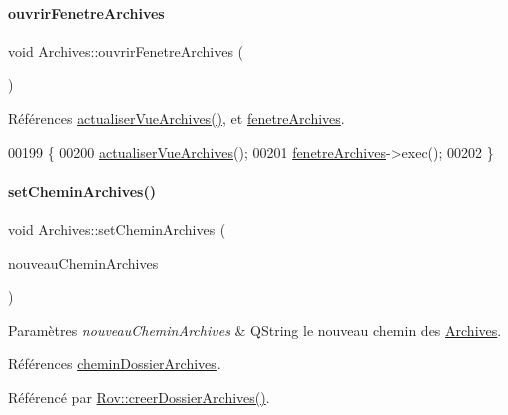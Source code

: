 \paragraph{\texorpdfstring{ouvrir\+Fenetre\+Archives}{ouvrirFenetreArchives}}
{\footnotesize\ttfamily void Archives\+::ouvrir\+Fenetre\+Archives (\begin{DoxyParamCaption}{ }\end{DoxyParamCaption})\hspace{0.3cm}{\ttfamily [slot]}}



Références \hyperlink{class_archives_a380ac387d773b07ea5138347dbaca65a}{actualiser\+Vue\+Archives()}, et \hyperlink{class_archives_ad7c8209637b01f638b64530020d18b8e}{fenetre\+Archives}.


\begin{DoxyCode}
00199 \{
00200     \hyperlink{class_archives_a380ac387d773b07ea5138347dbaca65a}{actualiserVueArchives}();
00201     \hyperlink{class_archives_ad7c8209637b01f638b64530020d18b8e}{fenetreArchives}->exec();
00202 \}
\end{DoxyCode}
\mbox{\label{class_archives_a899e95a34c2a6f79b9a25355b5bf9cb6}} 
\paragraph{\texorpdfstring{set\+Chemin\+Archives()}{setCheminArchives()}}
{\footnotesize\ttfamily void Archives\+::set\+Chemin\+Archives (\begin{DoxyParamCaption}\item[{Q\+String}]{nouveau\+Chemin\+Archives }\end{DoxyParamCaption})}


\begin{DoxyParams}{Paramètres}
{\em nouveau\+Chemin\+Archives} & Q\+String le nouveau chemin des \hyperlink{class_archives}{Archives}. \\
\hline
\end{DoxyParams}


Références \hyperlink{class_archives_af155e5062883030cddaa05623a34854b}{chemin\+Dossier\+Archives}.



Référencé par \hyperlink{class_rov_a53f656be57fa1eb7b93e03095a597439}{Rov\+::creer\+Dossier\+Archives()}.


